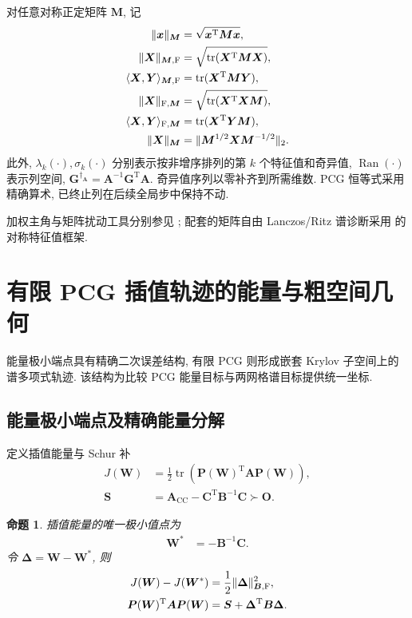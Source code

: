 \documentclass{ctexart}
\newcommand{\T}{\mathrm{T}}
\DeclareMathOperator{\tr}{tr}
\DeclareMathOperator{\Ran}{Ran}
\DeclarePairedDelimiter\norm{\lVert}{\rVert}
\DeclarePairedDelimiter\avg{\langle}{\rangle}
\newtheorem{proposition}[theorem]{命题}
\begin{document}
对任意对称正定矩阵 $\bm M$, 记
\begin{align}
    \norm{\bm x}_{\bm M}&=\sqrt{\bm x^\T\bm M\bm x},
    \label{eq:notation-vector-energy}\\
    \norm{\bm X}_{\bm M,\mathrm{F}}&=\sqrt{\tr(\bm X^\T\bm M\bm X)},
    \label{eq:notation-left-frob}\\
    \avg{\bm X,\bm Y}_{\bm M,\mathrm{F}}&=\tr(\bm X^\T\bm M\bm Y),
    \label{eq:notation-left-inner}\\
    \norm{\bm X}_{\mathrm{F},\bm M}&=\sqrt{\tr(\bm X^\T\bm X\bm M)},
    \label{eq:notation-right-frob}\\
    \avg{\bm X,\bm Y}_{\mathrm{F},\bm M}&=\tr(\bm X^\T\bm Y\bm M),
    \label{eq:notation-right-inner}\\
    \norm{\bm X}_{\bm M}&=\norm{\bm M^{1/2}\bm X\bm M^{-1/2}}_2.
    \label{eq:notation-induced-energy}
\end{align}
此外, $\lambda_k(\cdot),\sigma_k(\cdot)$ 分别表示按非增序排列的第 $k$ 个特征值和奇异值, $\Ran(\cdot)$ 表示列空间, $\bm G^{\dagger_{\bm A}}=\bm A^{-1}\bm G^\T\bm A$. 奇异值序列以零补齐到所需维数. PCG 恒等式采用精确算术, 已终止列在后续全局步中保持不动.

加权主角与矩阵扰动工具分别参见
\cite{knyazev2002angles,stewart1990perturbation}; 配套的矩阵自由 Lanczos/Ritz 谱诊断采用
\cite{bai2000templates} 的对称特征值框架.

\section{有限 PCG 插值轨迹的能量与粗空间几何}
\label{sec:finite-pcg-trajectory}

能量极小端点具有精确二次误差结构, 有限 PCG 则形成嵌套 Krylov 子空间上的谱多项式轨迹. 该结构为比较 PCG 能量目标与两网格谱目标提供统一坐标.

\subsection{能量极小端点及精确能量分解}
\label{subsec:energy-endpoint}

定义插值能量与 Schur 补
\begin{align}
    J(\bm W)&=\frac{1}{2}\tr(\bm P(\bm W)^\T\bm A\bm P(\bm W)),
    \label{eq:energy-functional}\\
    \bm S&=\bm A_{\mathrm{CC}}-\bm C^\T\bm B^{-1}\bm C\succ \mathbf{O}.
    \label{eq:schur-complement}
\end{align}

\begin{proposition}
\label{prop:energy-minimizer}
插值能量的唯一极小值点为
\begin{align}
    \bm W^{\ast}&=-\bm B^{-1}\bm C.
    \label{eq:energy-minimizer}
\end{align}
令 $\bm\Delta=\bm W-\bm W^{\ast}$, 则
\begin{align}
    J(\bm W)-J(\bm W^{\ast})&=\frac{1}{2}\norm{\bm\Delta}_{\bm B,\mathrm{F}}^2,
    \label{eq:energy-gap}\\
    \bm P(\bm W)^\T\bm A\bm P(\bm W)&=\bm S+\bm\Delta^\T\bm B\bm\Delta.
    \label{eq:coarse-matrix-energy-error}
\end{align}
\end{proposition}
\end{document}
